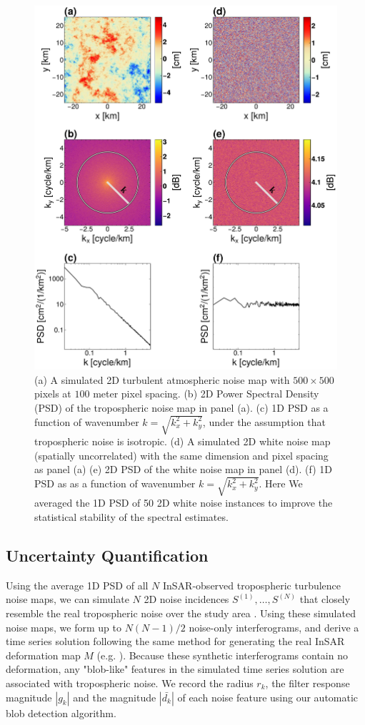 \begin{figure}
	\centering 
	\includegraphics[width=0.59\linewidth]{figures/chapter6-blobs/figure3_psd_radial.pdf}
	\caption{
		(a) A simulated 2D turbulent atmospheric noise map with $ 500 \times 500 $ pixels at $100$ meter pixel spacing.
		(b) 2D Power Spectral Density (PSD) of the tropospheric noise map in panel (a).
		(c) 1D PSD as a function of wavenumber $k = \sqrt{k_x^2 + k_y^2}$, under the assumption that tropospheric noise is isotropic.
		(d) A simulated 2D white noise map (spatially uncorrelated) with the same dimension and pixel spacing as panel (a)
		(e) 2D PSD of the white noise map in panel (d).
		(f) 1D PSD as as a function of wavenumber $k = \sqrt{k_x^2 + k_y^2}$. Here We averaged the 1D PSD of 50 2D white noise instances to improve the statistical stability of the spectral estimates.
	}
	\label{fig:psd-example}
\end{figure}


\subsection{Uncertainty Quantification}
\label{subsec:methods-3-noise-sim}

Using the average 1D PSD of all $N$ InSAR-observed tropospheric turbulence noise maps, we can simulate $N$ 2D noise incidences  $S^{(1)},\dots, S^{(N)} $ that closely resemble the real tropospheric noise over the study area \cite{Hanssen2001RadarInterferometryData}. Using these simulated noise maps, we form up to $N(N-1)/2$ noise-only interferograms, and derive a time series solution following the same method for generating the real InSAR deformation map $M$ (e.g. \cite{Sandwell1998PhaseGradientApproach, Berardino2002NewAlgorithmSurface}). Because these synthetic interferograms contain no deformation, any "blob-like" features in the simulated time series solution are associated with tropospheric noise. We record the radius $r_k$,  the filter response magnitude $|g_k|$ and the magnitude $|\bar{d_k}|$ of each noise feature using our automatic blob detection algorithm.

